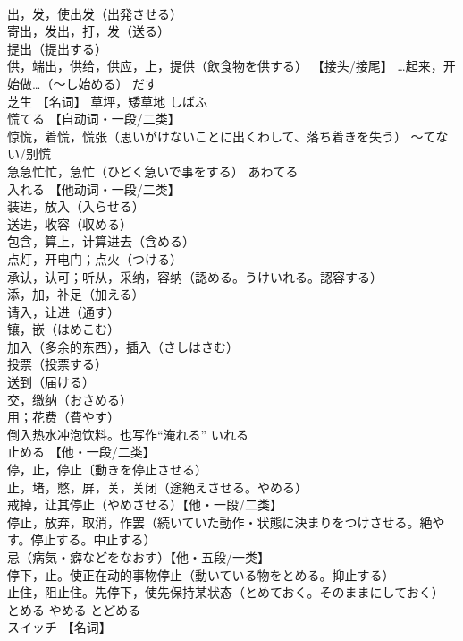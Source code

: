 \documentclass[8pt]{extreport}
\begin{document}
\begin{CJK}{UTF8}{min}
\\	出，发，使出发（出発させる） 
\\	寄出，发出，打，发（送る） 
\\	提出（提出する） 
\\	供，端出，供给，供应，上，提供（飲食物を供する） 【接头/接尾】 …起来，开始做…（～し始める）	だす	
\\	芝生	【名词】 草坪，矮草地	しばふ	
\\	慌てる	【自动词・一段/二类】 
\\	惊慌，着慌，慌张（思いがけないことに出くわして、落ち着きを失う） 〜てない/别慌 
\\	急急忙忙，急忙（ひどく急いで事をする）	あわてる	
\\	入れる	【他动词・一段/二类】 
\\	装进，放入（入らせる） 
\\	送进，收容（収める） 
\\	包含，算上，计算进去（含める） 
\\	点灯，开电门；点火（つける） 
\\	承认，认可；听从，采纳，容纳（認める。うけいれる。認容する） 
\\	添，加，补足（加える） 
\\	请入，让进（通す） 
\\	镶，嵌（はめこむ） 
\\	加入（多余的东西），插入（さしはさむ） 
\\	投票（投票する） 
\\	送到（届ける） 
\\	交，缴纳（おさめる） 
\\	用；花费（費やす） 
\\	倒入热水冲泡饮料。也写作“淹れる”	いれる	
\\	止める	【他・一段/二类】 
\\	停，止，停止〔動きを停止させる） 
\\	止，堵，憋，屏，关，关闭（途絶えさせる。やめる） 
\\	戒掉，让其停止（やめさせる）【他・一段/二类】 
\\	停止，放弃，取消，作罢（続いていた動作・状態に決まりをつけさせる。絶やす。停止する。中止する） 
\\	忌（病気・癖などをなおす）【他・五段/一类】 
\\	停下，止。使正在动的事物停止（動いている物をとめる。抑止する） 
\\	止住，阻止住。先停下，使先保持某状态（とめておく。そのままにしておく）	とめる やめる とどめる	
\\	スイッチ	【名词】 

\end{CJK}
\end{document}
